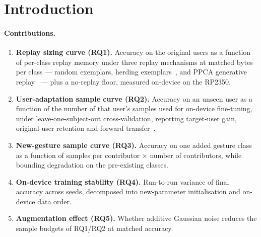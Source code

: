 \section{Introduction}
\label{sec:intro}




\paragraph{Contributions.}
\begin{enumerate}
  \item \textbf{Replay sizing curve (RQ1).} Accuracy on the original users as a function of per-class replay memory under three replay mechanisms at matched bytes per class --- random exemplars, herding exemplars~\cite{rebuffi2017icarl}, and PPCA generative replay~\cite{tipping1999ppca} --- plus a no-replay floor, measured on-device on the RP2350.
  \item \textbf{User-adaptation sample curve (RQ2).} Accuracy on an unseen user as a function of the number of that user's samples used for on-device fine-tuning, under leave-one-subject-out cross-validation, reporting target-user gain, original-user retention and forward transfer~\cite{lopezpaz2017gem}.
  \item \textbf{New-gesture sample curve (RQ3).} Accuracy on one added gesture class as a function of samples per contributor $\times$ number of contributors, while bounding degradation on the pre-existing classes.
  \item \textbf{On-device training stability (RQ4).} Run-to-run variance of final accuracy across seeds, decomposed into new-parameter initialisation and on-device data order.
  \item \textbf{Augmentation effect (RQ5).} Whether additive Gaussian noise reduces the sample budgets of RQ1/RQ2 at matched accuracy.
\end{enumerate}

